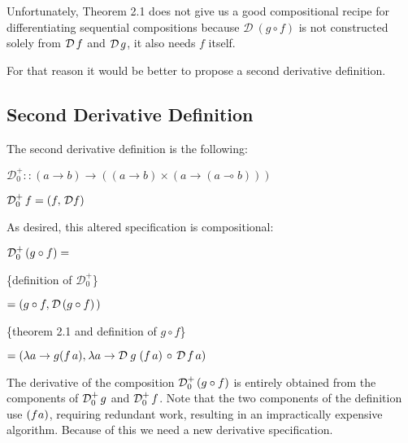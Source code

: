 \documentclass[11pt,a4]{article}
\theoremstyle{definition}
\theoremstyle{Definition}
\theoremstyle{Definition}
\begin{document}
	Unfortunately, Theorem 2.1 does not give us a good compositional recipe for differentiating sequential compositions because $\mathcal{D} \ (g \circ f )$ is not constructed solely from $\mathcal{D} \hspace{0.5mm} f$ and $\mathcal{D} \hspace{0.5mm} g$, it also needs $f$ itself.
	
	For that reason it would be better to propose a second derivative definition.
	\vspace{13mm}
	\subsection{Second Derivative Definition}
	
	The second derivative definition is the following:
	
	$\mathcal{D}_{0}^{+} :: (a \to b) \to ((a \to b) \times (a \to (a \multimap b)))$ 
	
	$\mathcal{D}_{0}^{+} \hspace{0.5mm} f =(f,\hspace{0.5mm} \mathcal{D} f)$
	
	As desired, this altered specification is compositional:
	
	$\mathcal{D}_{0}^{+} \hspace{0.5mm} (g \circ f)= $ 
	
	\{definition of $\mathcal{D}_{0}^{+}$\}
	
	$= (g \circ f,\hspace{0.2mm} \mathcal{D} \hspace{0.5mm} (g \circ f) \hspace{0.5mm})$ \hspace{3.3cm} 
	
	\{theorem 2.1 and definition of $g \circ f$\}
	
	$= (\lambda a \to g (f \hspace{0.5mm} a),\hspace{0.2mm} \lambda a \to \mathcal{D} \hspace{0.9mm} g \hspace{1.0mm}  (f \hspace{0.5mm} a)   \hspace{0.5mm} \circ \hspace{0.5mm} \mathcal{D} \hspace{0.5mm} f \hspace{0.5mm} a )$ \hspace{1.5mm} 
	
	
	The derivative of the composition $\mathcal{D}_{0}^{+} \hspace{0.5mm} (g \circ f) $ is entirely obtained from the components of $\mathcal{D}_{0}^{+} \hspace{0.5mm} g $ and $\mathcal{D}_{0}^{+} \hspace{0.5mm} f $. Note that the two components of the definition use $(f \hspace{0.1mm} a)$, requiring redundant work, resulting in an impractically expensive algorithm. Because of this we need a new derivative specification.
	
\end{document}
